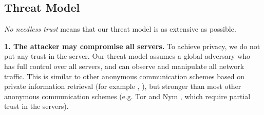 \subsection{Threat Model}
\label{subsec:threatmodel}


\textit{No needless trust} means that our threat model is as extensive as possible.




\textbf{1. The attacker may compromise all servers.} To achieve privacy, we do not put any trust in the server. Our threat model assumes a global adversary who has full control over all servers, and can observe and manipulate all network traffic. This is similar to other anonymous communication schemes based on private information retrieval (for example \cite{ahmad2021addra}, ), but stronger than most other anonymous communication schemes (e.g. Tor \cite{dingledine2004tor} and Nym \cite{piotrowska2017loopix}, which require partial trust in the servers).

